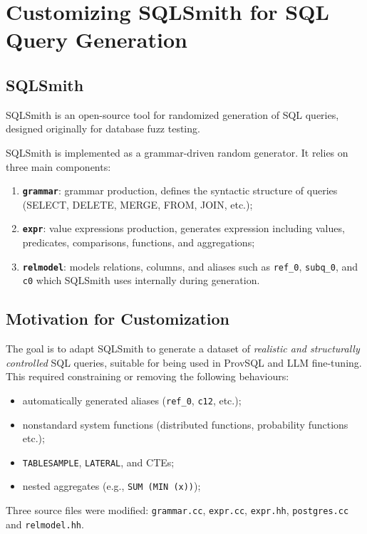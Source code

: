 \documentclass{article}
\begin{document}
\section{Customizing SQLSmith for SQL Query Generation}

\subsection{SQLSmith}
SQLSmith is an open-source tool for randomized generation of SQL queries,
designed originally for database fuzz testing.

SQLSmith is implemented as a grammar-driven random generator.
It relies on three main components:
\begin{enumerate}
    \item \textbf{\texttt{grammar}}: grammar production, defines the syntactic structure of queries
          (SELECT, DELETE, MERGE, FROM, JOIN, etc.);
    \item \textbf{\texttt{expr}}: value expressions production, generates expression including values,
          predicates, comparisons, functions, and aggregations;
    \item \textbf{\texttt{relmodel}}: models relations, columns, and aliases
          such as \texttt{ref\_0}, \texttt{subq\_0}, and \texttt{c0} which SQLSmith
          uses internally during generation.
\end{enumerate}


\subsection{Motivation for Customization}
The goal is to adapt SQLSmith to generate a dataset of
\emph{realistic and structurally controlled} SQL queries, suitable for being used in ProvSQL and LLM fine-tuning.
This required constraining or removing the following behaviours:
\begin{itemize}
    \item automatically generated aliases (\texttt{ref\_0}, \texttt{c12}, etc.);
    \item nonstandard system functions (distributed functions, probability functions etc.);
    \item \texttt{TABLESAMPLE}, \texttt{LATERAL}, and CTEs;
    \item nested aggregates (e.g., \texttt{SUM (MIN (x))});
\end{itemize}

Three source files were modified: \texttt{grammar.cc}, \texttt{expr.cc}, \texttt{expr.hh}, \texttt{postgres.cc} and
\texttt{relmodel.hh}.
\end{document}

